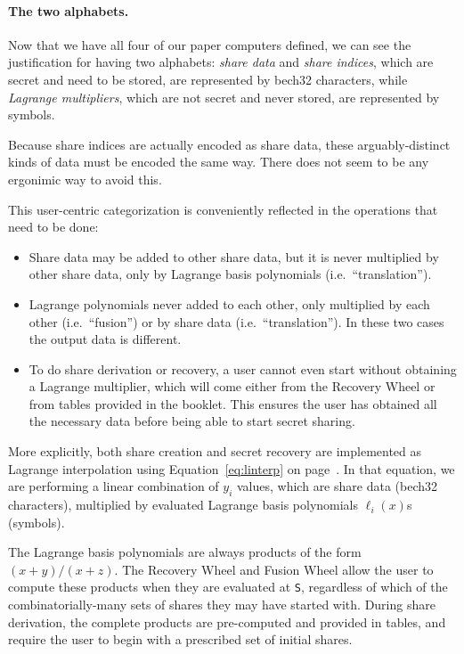 \documentclass[letterpaper]{article}
\newcommand{\vc}[1]{\texttt{#1}} %
\begin{document}
\paragraph{The two alphabets.}
Now that we have all four of our paper computers defined, we can see the
justification for having two alphabets: \emph{share data} and \emph{share
indices}, which are secret and need to be stored, are represented by bech32
characters, while \emph{Lagrange multipliers}, which are not secret and
never stored, are represented by symbols.

Because share indices are actually encoded as share data, these arguably-distinct
kinds of data must be encoded the same way. There does not seem to be any ergonimic
way to avoid this.

This user-centric categorization is conveniently reflected in the operations that
need to be done:

\begin{itemize}
\item Share data may be added to other share data, but it is never multiplied
by other share data, only by Lagrange basis polynomials (i.e.~``translation'').
\item Lagrange polynomials never added to each other, only multiplied by
each other (i.e.~``fusion'') or by share data (i.e.~``translation''). In these
two cases the output data is different.
\item To do share derivation or recovery, a user cannot even start without
obtaining a Lagrange multiplier, which will come either from the Recovery Wheel
or from tables provided in the booklet. This ensures the user has obtained all
the necessary data before being able to start secret sharing.
\end{itemize}

More explicitly, both share creation and secret recovery are implemented as
Lagrange interpolation using Equation~\eqref{eq:linterp} on page~\pageref{eq:linterp}.
In that equation, we are performing a linear combination of $y_i$ values, which
are share data (bech32 characters), multiplied by evaluated Lagrange basis
polynomials $\ell_i(x)$s (symbols).

The Lagrange basis polynomials are always products of the form $(x + y)/(x + z)$.
The Recovery Wheel and Fusion Wheel allow the user to compute these products when
they are evaluated at \vc{S}, regardless of which of the combinatorially-many sets
of shares they may have started with. During share derivation, the complete products
are pre-computed and provided in tables, and require the user to begin with a
prescribed set of initial shares.
\end{document}
